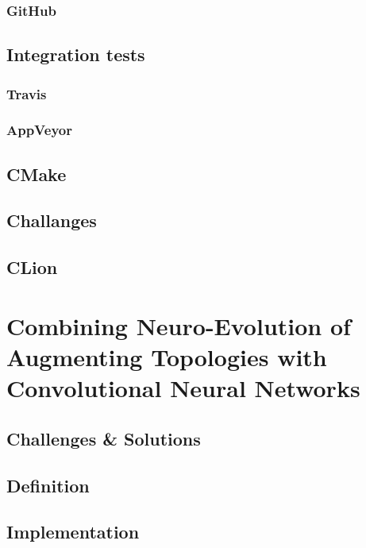 \documentclass[11pt]{article}
\begin{document}
			\subsubsection{GitHub}
				
		\subsection{Integration tests}
			
			\subsubsection{Travis}
				
			\subsubsection{AppVeyor}
				
		\subsection{CMake}
			
		\subsection{Challanges}
			\subsection{CLion}
				
	\newpage

	\section{Combining Neuro-Evolution of Augmenting Topologies with Convolutional Neural Networks}
		\subsection{Challenges \& Solutions}
			
		\subsection{Definition}
			
		\subsection{Implementation}
			
	\newpage
\end{document}
